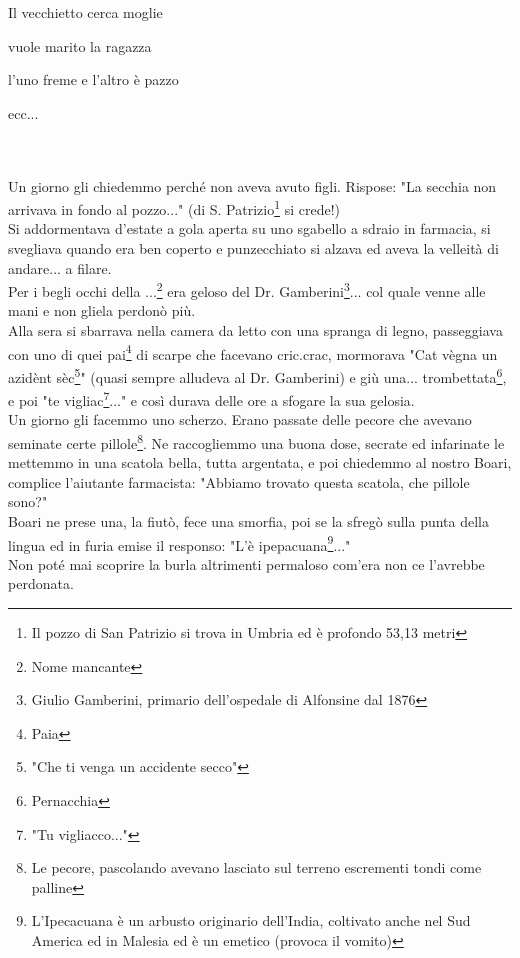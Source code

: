 \documentclass[10pt]{memoir} %
\begin{document}
\textcal \Huge
	\centerline{Il vecchietto cerca moglie}
	\centerline{vuole marito la ragazza}
	\centerline{l'uno freme e l'altro è pazzo}
	\centerline{ecc...}
\normalfont \normalsize
\\\\Un giorno gli chiedemmo perché non aveva avuto figli. Rispose: "La secchia non arrivava in fondo al pozzo..." (di S. Patrizio\footnote{Il pozzo di San Patrizio si trova in Umbria ed è profondo 53,13 metri} si crede!)\\
Si addormentava d'estate a gola aperta su uno sgabello a sdraio in farmacia, si svegliava quando era ben coperto e punzecchiato si alzava ed aveva la velleità di andare... a filare. \\
Per i begli occhi della ...\footnote{Nome mancante} era geloso del Dr. Gamberini\footnote{Giulio Gamberini, primario dell'ospedale di Alfonsine dal 1876}... col quale venne alle mani e non gliela perdonò più. \\
Alla sera si sbarrava nella camera da letto con una spranga di legno, passeggiava con uno di quei pai\footnote{Paia} di scarpe che facevano cric.crac, mormorava "Cat vègna un azidènt sèc\footnote{"Che ti venga un accidente secco"}" (quasi sempre alludeva al Dr. Gamberini) e giù una... trombettata\footnote{Pernacchia}, e poi "te vigliac\footnote{"Tu vigliacco..."}..." e così durava delle ore a sfogare la sua gelosia.\\
Un giorno gli facemmo uno scherzo. Erano passate delle pecore che avevano seminate certe pillole\footnote{Le pecore, pascolando avevano lasciato sul terreno escrementi tondi come palline}. Ne raccogliemmo una buona dose, secrate ed infarinate le mettemmo in una scatola bella, tutta argentata, e poi chiedemmo al nostro Boari, complice l'aiutante farmacista: "Abbiamo trovato questa scatola, che pillole sono?"\\
Boari ne prese una, la fiutò, fece una smorfia, poi se la sfregò sulla punta della lingua ed in furia emise il responso: "L'è ipepacuana\footnote{L'Ipecacuana è un arbusto originario dell'India, coltivato anche nel Sud America ed in Malesia ed è un emetico (provoca il vomito)}..."\\
Non poté mai scoprire la burla altrimenti permaloso com'era non ce l'avrebbe perdonata.

\end{document}
